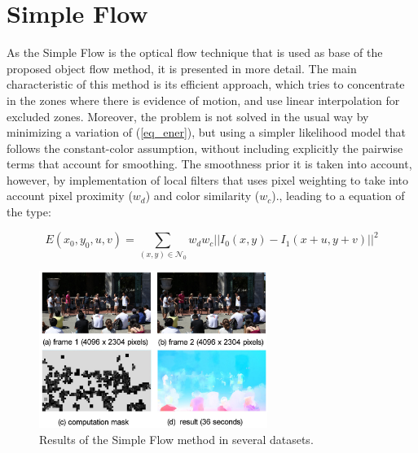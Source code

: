 \section{Simple Flow}

As the Simple Flow \cite{c21} is the optical flow technique that is used as base of the proposed 
object flow method, it is presented in more detail. 
The main characteristic of this method is its efficient approach, which tries to concentrate in the zones where there is evidence of motion, and use linear 
interpolation for excluded zones. 
Moreover, the problem is not solved in the usual way by minimizing a variation of (\ref{eq_ener}), but using a simpler likelihood model that 
follows the constant-color assumption, without including explicitly the pairwise terms that account for smoothing. The smoothness prior it is taken into 
account, however, by implementation of local filters that uses pixel weighting to take into account pixel proximity ($w_d$) and color similarity ($w_c$)., leading to a equation 
of the type: 

\begin{equation}
E(x_0, y_0, u, v) = \sum_{(x,y) \in \mathcal{N}_{0}} w_{d}w_{c}||  I_{0}(x,y) - I_{1}(x+u,y+v) ||^2
\label{eq_simple}
\end{equation}

   \begin{figure}[bhp]
      \centering
      \includegraphics[width=0.66\textwidth]{../images/simpleflow.png}
      \caption{  Results of the Simple Flow method in several datasets. }
      \label{simple_of}
   \end{figure}

